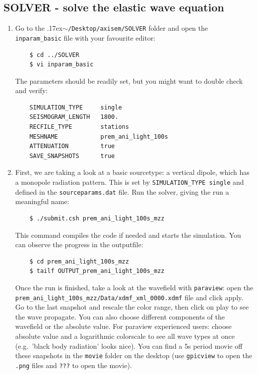 \documentclass{article}
\newcommand{\ttilde}[0]{\raise.17ex\hbox{$\scriptstyle\sim$}}
\begin{document}
\subsection{SOLVER - solve the elastic wave equation}
    
\begin{enumerate}
    \item Go to the \ttilde\verb|/Desktop/axisem/SOLVER| folder and open the
    \verb|inparam_basic| file with your favourite editor:
    \begin{verbatim}
    $ cd ../SOLVER
    $ vi inparam_basic
    \end{verbatim}
    The parameters should be readily set, but you might want to double check and verify:
    \begin{verbatim}
    SIMULATION_TYPE     single
    SEISMOGRAM_LENGTH   1800.
    RECFILE_TYPE        stations 
    MESHNAME            prem_ani_light_100s
    ATTENUATION         true 
    SAVE_SNAPSHOTS      true  
    \end{verbatim}
    \item First, we are taking a look at a basic sourcetype: a vertical dipole, which has
    a monopole radiation pattern. This is set by \verb|SIMULATION_TYPE single| and defined
    in the \verb|sourceparams.dat| file. Run the solver, giving the run a meaningful name:
    \begin{verbatim}
    $ ./submit.csh prem_ani_light_100s_mzz
    \end{verbatim}
    This command compiles the code if needed and starts the simulation. You can observe
    the progress in the outputfile:
    \begin{verbatim}
    $ cd prem_ani_light_100s_mzz
    $ tailf OUTPUT_prem_ani_light_100s_mzz
    \end{verbatim}
    Once the run is finished, take a look at the wavefield with \verb|paraview|: open
    the \verb|prem_ani_light_100s_mzz/Data/xdmf_xml_0000.xdmf| file and click apply. Go to
    the last snapshot and rescale the color range, then click on play to see the wave
    propagate.  You can also choose different components of the wavefield or the absolute
    value.  For paraview experienced users: choose absolute value and a logarithmic
    colorscale to see all wave types at once (e.g.\ 'black body radiation' looks nice).
    You can find a 5s period movie off these snapshots in the \verb|movie| folder on the
    desktop (use \verb|gpicview| to open the \verb|.png| files and \verb|???| to open the
    movie).
   

\end{enumerate}
\end{document}
